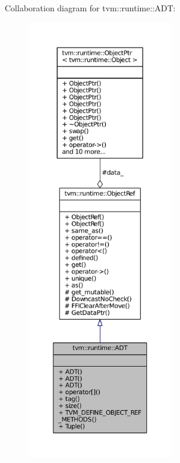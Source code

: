 Collaboration diagram for tvm\+:\+:runtime\+:\+:A\+DT\+:
\nopagebreak
\begin{figure}[H]
\begin{center}
\leavevmode
\includegraphics[height=550pt]{classtvm_1_1runtime_1_1ADT__coll__graph}
\end{center}
\end{figure}

